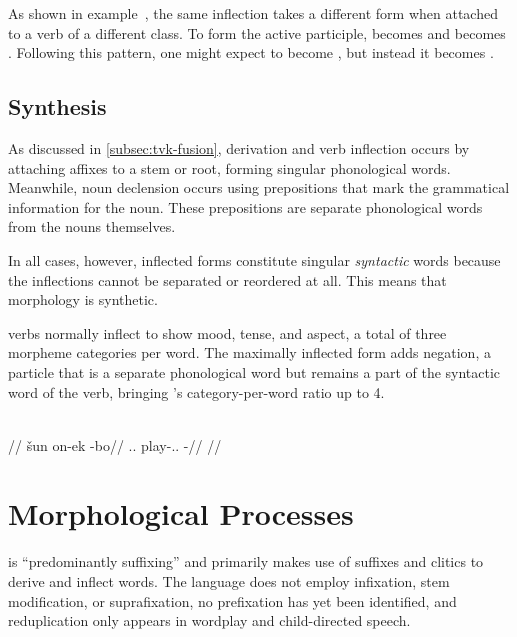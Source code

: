 As shown in example~, the same inflection takes a different form when attached to a verb of a different class. To form the active participle,  becomes  and  becomes . Following this pattern, one might expect  to become \ungr{}, but instead it becomes .


\subsection{Synthesis}
\label{subsec:tvk-synthesis}

As discussed in \autoref{subsec:tvk-fusion}, derivation and verb inflection occurs by attaching affixes to a stem or root, forming singular phonological words. Meanwhile, noun declension occurs using prepositions that mark the grammatical information for the noun. These prepositions are separate phonological words from the nouns themselves.

In all cases, however, inflected forms constitute singular \emph{syntactic} words because the inflections cannot be separated or reordered at all. This means that \langtvk{} morphology is synthetic\autocite{wals-22}.

\langtvk{} verbs normally inflect to show mood, tense, and aspect, a total of three morpheme categories per word. The maximally inflected form adds negation, a particle that is a separate phonological word but remains a part of the syntactic word of the verb, bringing \langtvk's category-per-word ratio up to 4\autocite{wals-22}.

	\begingl
		\glpreamble{}\\
		//
		\gla šun on-ek -bo//
		\glb \Tps.\An.\Top{} play-\Ind.\Pst.\Pfv{} -\Neg//
		\glft{}//
	\endgl
\xe



\section{Morphological Processes}
\label{sec:tvk-processes}

\langtvk{} is \enquote{predominantly suffixing}\autocite{wals-26} and primarily makes use of suffixes and clitics to derive and inflect words. The language does not employ infixation, stem modification, or suprafixation, no prefixation has yet been identified, and reduplication only appears in wordplay and child-directed speech.


